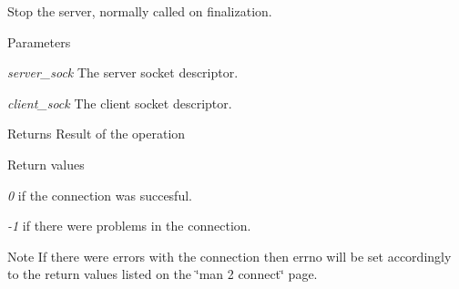 Stop the server, normally called on finalization. 


\begin{DoxyParams}{Parameters}
\item[{\em server\_\-sock}]The server socket descriptor. \item[{\em client\_\-sock}]The client socket descriptor. \end{DoxyParams}
\begin{DoxyReturn}{Returns}
Result of the operation 
\end{DoxyReturn}

\begin{DoxyRetVals}{Return values}
\item[{\em 0}]if the connection was succesful. \item[{\em -\/1}]if there were problems in the connection. \end{DoxyRetVals}
\begin{DoxyNote}{Note}
If there were errors with the connection then {\ttfamily errno} will be set accordingly to the return values listed on the {\ttfamily \char`\"{}man 2
        connect\char`\"{}} page. 
\end{DoxyNote}
